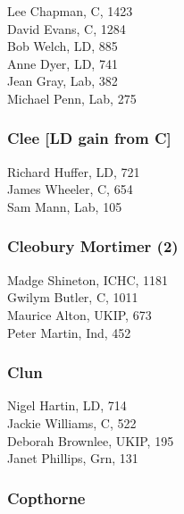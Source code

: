 \documentclass[a4paper,openany,10pt]{book}
\begin{document}


Lee Chapman, C, 1423\\
David Evans, C, 1284\\
Bob Welch, LD, 885\\
Anne Dyer, LD, 741\\
Jean Gray, Lab, 382\\
Michael Penn, Lab, 275\\


\subsubsection*{Clee \hspace*{\fill}\nolinebreak[1]%
\enspace\hspace*{\fill}
[LD gain from C]}



Richard Huffer, LD, 721\\
James Wheeler, C, 654\\
Sam Mann, Lab, 105\\


\subsubsection*{Cleobury Mortimer (2)}



Madge Shineton, ICHC, 1181\\
Gwilym Butler, C, 1011\\
Maurice Alton, UKIP, 673\\
Peter Martin, Ind, 452\\


\subsubsection*{Clun}



Nigel Hartin, LD, 714\\
Jackie Williams, C, 522\\
Deborah Brownlee, UKIP, 195\\
Janet Phillips, Grn, 131\\


\subsubsection*{Copthorne}
\end{document}
